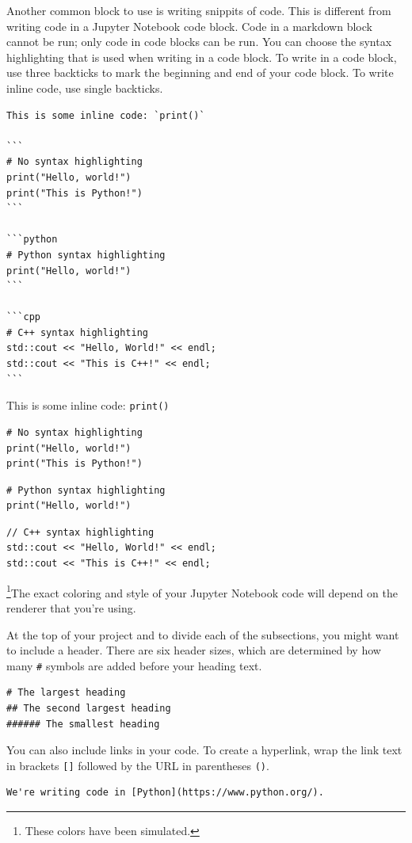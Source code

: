 Another common block to use is writing snippits of code. This is different from writing code in a Jupyter Notebook code block. Code in a markdown block cannot be run; only code in code blocks can be run. You can choose the syntax highlighting that is used when writing in a code block. To write in a code block, use three backticks to mark the beginning and end of your code block. To write inline code, use single backticks.\par
{}
\begin{lstlisting}
This is some inline code: `print()`

```
# No syntax highlighting
print("Hello, world!")
print("This is Python!")
```

```python
# Python syntax highlighting
print("Hello, world!")
```

```cpp
# C++ syntax highlighting
std::cout << "Hello, World!" << endl;
std::cout << "This is C++!" << endl;
```
\end{lstlisting}
This is some inline code: \verb|print()|
\\
\begin{lstlisting}
# No syntax highlighting
print("Hello, world!")
print("This is Python!")
\end{lstlisting}
\begin{lstlisting}[style=pippython]
# Python syntax highlighting
print("Hello, world!")
\end{lstlisting}

\begin{lstlisting}[style=cpp]
// C++ syntax highlighting
std::cout << "Hello, World!" << endl;
std::cout << "This is C++!" << endl;
\end{lstlisting}
\footnote{These colors have been simulated.}The exact coloring and style of your Jupyter Notebook code will depend on the renderer that you're using.\par
At the top of your project and to divide each of the subsections, you might want to include a header. There are six header sizes, which are determined by how many \verb|#| symbols are added before your heading text.
\begin{lstlisting}
# The largest heading
## The second largest heading
###### The smallest heading
\end{lstlisting}
You can also include links in your code. To create a hyperlink, wrap the link text in brackets \verb|[]| followed by the URL in parentheses \verb|()|.\par
\begin{lstlisting}
We're writing code in [Python](https://www.python.org/).
\end{lstlisting}

